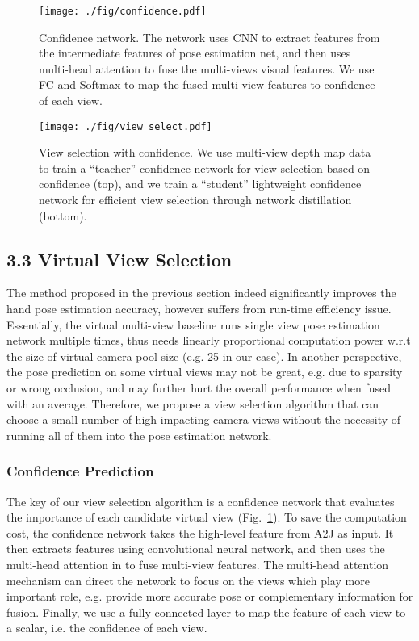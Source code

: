 \documentclass[letterpaper]{article} \usepackage{aaai22}  \usepackage{times}  \usepackage{helvet}  \usepackage{courier}  \usepackage[hyphens]{url}  \usepackage{graphicx} \urlstyle{rm} \def\UrlFont{\rm}  \usepackage{natbib}  \usepackage{caption} \DeclareCaptionStyle{ruled}{labelfont=normalfont,labelsep=colon,strut=off} \frenchspacing  \setlength{\pdfpagewidth}{8.5in}  \setlength{\pdfpageheight}{11in}  \usepackage{algorithm}
\begin{document}
\begin{figure}[t]
\centering 
\texttt{[image: ./fig/confidence.pdf]}
\caption{Confidence network. The network uses CNN to extract features from the intermediate features of pose estimation net, and then uses multi-head attention to fuse the multi-views visual features. We use FC and Softmax to map the fused multi-view features to confidence of each view. 
}
\label{fig:confidence}
\end{figure}

\begin{figure*}[ht]
\centering 
\texttt{[image: ./fig/view\_select.pdf]}
\caption{View selection with confidence. We use multi-view depth map data to train a ``teacher'' confidence network for view selection based on confidence (top), and we train a ``student'' lightweight confidence network for efficient view selection through network distillation (bottom).}
\label{fig:multi-view_fusion}
\end{figure*}

\subsection{3.3 Virtual View Selection}
\label{sec3.3}
The method proposed in the previous section indeed significantly improves the hand pose estimation accuracy, however suffers from run-time efficiency issue.
Essentially, the virtual multi-view baseline runs single view pose estimation network multiple times, thus needs linearly proportional computation power w.r.t the size of virtual camera pool size (e.g. 25 in our case).
In another perspective, the pose prediction on some virtual views may not be great, e.g. due to sparsity or wrong occlusion, and may further hurt the overall performance when fused with an average.
Therefore, we propose a view selection algorithm that can choose a small number of high impacting camera views without the necessity of running all of them into the pose estimation network.

\subsubsection{Confidence Prediction}
The key of our view selection algorithm is a confidence network that evaluates the importance of each candidate virtual view (Fig.~\ref{fig:confidence}).
To save the computation cost, the confidence network takes the high-level feature from A2J as input.
It then extracts features using convolutional neural network, and then uses the multi-head attention in \cite{vaswani2017attention} to fuse multi-view features.
The multi-head attention mechanism can direct the network to focus on the views which play more important role, e.g. provide more accurate pose or complementary information for fusion. Finally, we use a fully connected layer to map the feature of each view to a scalar, i.e. the confidence of each view. 
\end{document}
